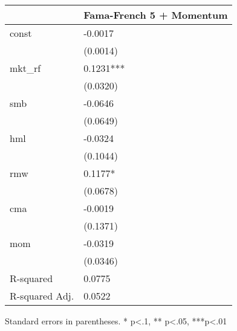 \begin{table}
\caption{}
\label{}
\begin{center}
\begin{tabular}{ll}
\hline
               & Fama-French 5 + Momentum  \\
\hline
const          & -0.0017                   \\
               & (0.0014)                  \\
mkt\_rf        & 0.1231***                 \\
               & (0.0320)                  \\
smb            & -0.0646                   \\
               & (0.0649)                  \\
hml            & -0.0324                   \\
               & (0.1044)                  \\
rmw            & 0.1177*                   \\
               & (0.0678)                  \\
cma            & -0.0019                   \\
               & (0.1371)                  \\
mom            & -0.0319                   \\
               & (0.0346)                  \\
R-squared      & 0.0775                    \\
R-squared Adj. & 0.0522                    \\
\hline
\end{tabular}
\end{center}
\end{table}
\bigskip
Standard errors in parentheses. \newline 
* p<.1, ** p<.05, ***p<.01
